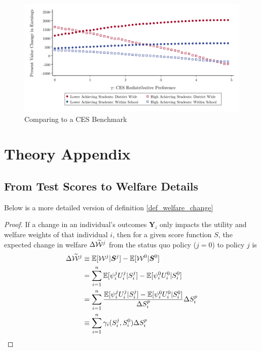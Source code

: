 \documentclass[12pt]{article}
\theoremstyle{definition}
\theoremstyle{definition}
\theoremstyle{definition}
\theoremstyle{definition}
\begin{document}
\begin{figure}[hbtp]
\centering
\includegraphics[width=.9\textwidth]{Working_Paper/test_figures/A5_CES.pdf}
    \caption{Comparing to a CES Benchmark}
    \label{fig:ces}
\end{figure}


\section{Theory Appendix}
\label{theory_appendix}

\subsection{From Test Scores to Welfare Details}
\label{definition_details}
Below is a more detailed version of definition \ref{def_welfare_change}
   \begin{proof}
    \label{def_welfare_change_detailed}
    If a change in an individual's outcomes $\bm{Y}_i$ only impacts the utility and welfare weights of that individual $i$, then for a given score function $S$, the expected change in welfare $  \Delta \accentset{\sim}{\mathcal{W}}^j$ from the status quo policy ($j=0$) to policy $j$ is 
    \begin{align*}
           \Delta \accentset{\sim}{\mathcal{W}}^j&\equiv   \mathbb{E}[\mathcal{W}^j|\bm{S}^j] - \mathbb{E}[\mathcal{W}^0|\bm{S}^0]  \\
             &  = \sum_{i=1}^n \mathbb{E}[\psi^j_i U^j_i |S_i^j] - \mathbb{E}[\psi^0_i U^0_i |S_i^0] \\ 
           &  = \sum_{i=1}^n \frac{\mathbb{E}[\psi^j_i U^j_i |S_i^j] - \mathbb{E}[\psi^0_i U^0_i |S_i^0]}{\Delta S^p_i} \Delta S^p_i \\ 
          &   \equiv \sum_{i=1}^n \gamma_i(S_i^j, S_i^0) \Delta S^p_i 
    \end{align*}


\end{proof}
\end{document}
